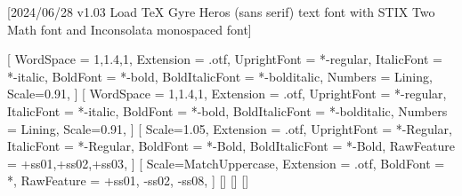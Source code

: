 
[2024/06/28 v1.03 Load TeX Gyre Heros (sans serif) text font with STIX Two Math font and Inconsolata monospaced font]

%
%
\ifpdftex
	\RequirePackage[T1]{fontenc}
	\RequirePackage{bm}
\else
    \RequirePackage[warnings-off={mathtools-colon,mathtools-overbracket}]{unicode-math}

    \setmainfont{texgyreheros}[%
		WordSpace = {1,1.4,1},
		Extension = .otf,
    	UprightFont = *-regular,
    	ItalicFont = *-italic,
    	BoldFont = *-bold,
    	BoldItalicFont = *-bolditalic,
		Numbers = Lining,
    	Scale=0.91,
	]        
    \setsansfont{texgyreheros}[%
		WordSpace = {1,1.4,1},
		Extension = .otf,
    	UprightFont = *-regular,
    	ItalicFont = *-italic,
    	BoldFont = *-bold,
    	BoldItalicFont = *-bolditalic,
		Numbers = Lining,
    	Scale=0.91,
	]        
   \setmonofont{Inconsolatazi4}[%
        Scale=1.05,
        Extension = .otf,
        UprightFont = *-Regular,
        ItalicFont = *-Regular,%
        BoldFont = *-Bold, 
    	BoldItalicFont = *-Bold,%
        RawFeature = {+ss01,+ss02,+ss03},
    ]             
    [%
    	Scale=MatchUppercase,
    	Extension = .otf,
		BoldFont = *,%
    	RawFeature = {+ss01, -ss02, -ss08},
    ]
    \setmathfontface{}[]%
    \setmathfontface{}[]
    \setmathfontface{}[]%
    \newcommand*{\FRAC}[1]{{\addfontfeature{Fractions=On}#1}}%
\fi
